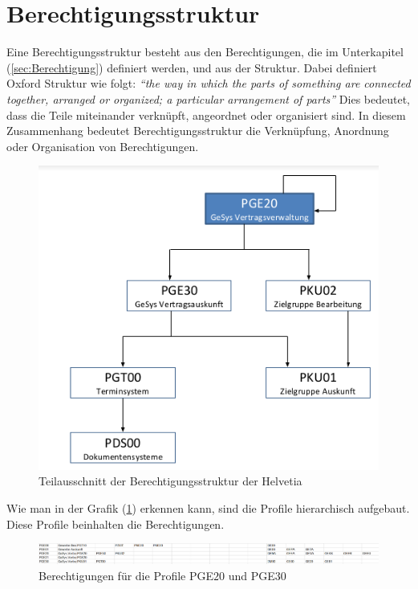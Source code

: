 \section{Berechtigungsstruktur}
\label{sec:Berechtigungsstruktur}
Eine Berechtigungsstruktur besteht aus den Berechtigungen, die im Unterkapitel (\ref{sec:Berechtigung}) definiert werden, und aus der Struktur.
Dabei definiert Oxford Struktur wie folgt:
\newline
\newline
\textit{"`the way in which the parts of something are connected together, arranged or organized; a particular arrangement of parts"'} \cite{Struct}
\newline
\newline
Dies bedeutet, dass die Teile miteinander verknüpft, angeordnet oder organisiert sind. \cite{Struct}
\newline
In diesem Zusammenhang bedeutet Berechtigungsstruktur die Verknüpfung, Anordnung oder Organisation von Berechtigungen.
\begin{figure}[h!]
 \centering
 \includegraphics[width=1\textwidth]{gfx/Picture/Struktur.PNG}
 \caption{Teilausschnitt der Berechtigungsstruktur der Helvetia}
 \label{fig:Teil}
\end{figure}
Wie man in der Grafik (\ref{fig:Teil}) erkennen kann, sind die Profile hierarchisch aufgebaut.
Diese Profile beinhalten die Berechtigungen.
\begin{figure}[h!]
\hspace*{-4cm}
 \centering
 \includegraphics[width=1.6\textwidth]{gfx/Picture/Ber.PNG}
 \caption{Berechtigungen für die Profile PGE$20$ und PGE$30$}
 \label{fig:Ber}
\end{figure}
